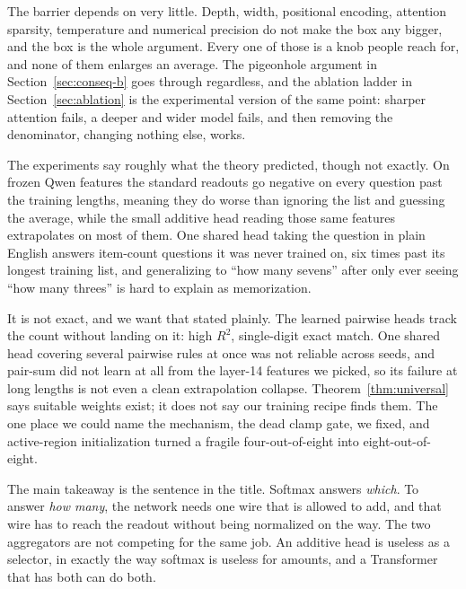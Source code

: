 \documentclass[10pt]{article}
\theoremstyle{definition}
\begin{document}
The barrier depends on very little. Depth, width, positional encoding,
attention sparsity, temperature and numerical precision do not make the
box any bigger, and the box is the whole argument. Every one of those is a knob people
reach for, and none of them enlarges an average. The pigeonhole argument
in Section~\ref{sec:conseq-b} goes through regardless, and the ablation
ladder in Section~\ref{sec:ablation} is the experimental version of the
same point: sharper attention fails, a deeper and wider model fails, and
then removing the denominator, changing nothing else, works.

The experiments say roughly what the theory predicted, though not exactly.
On frozen Qwen features the standard readouts go negative on every question
past the training lengths, meaning they do worse than ignoring the list and
guessing the average, while the small additive head reading those same
features extrapolates on most of them. One shared head taking the question
in plain English answers item-count questions it was never trained on, six
times past its longest training list, and generalizing to ``how many
sevens'' after only ever seeing ``how many threes'' is hard to explain as
memorization.

It is not exact, and we want that stated plainly. The learned pairwise
heads track the count without landing on it: high $R^2$, single-digit exact
match. One shared head covering several pairwise rules at once was not
reliable across seeds, and pair-sum did not learn at all from the layer-14
features we picked, so its failure at long lengths is not even a clean
extrapolation collapse. Theorem~\ref{thm:universal} says suitable weights
exist; it does not say our training recipe finds them. The one place we
could name the mechanism, the dead clamp gate, we fixed, and active-region
initialization turned a fragile four-out-of-eight into eight-out-of-eight.

The main takeaway is the sentence in the title. Softmax answers
\emph{which}. To answer \emph{how many}, the network needs
one wire that is allowed to add, and that wire has to reach the readout
without being normalized on the way. The two aggregators are not competing
for the same job. An additive head is useless as a selector, in exactly
the way softmax is useless for amounts, and a Transformer that has both
can do both.
\end{document}

